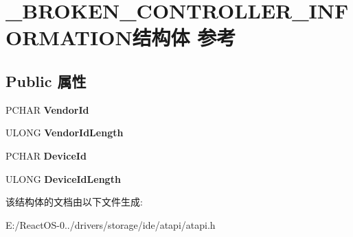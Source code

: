 \hypertarget{struct___b_r_o_k_e_n___c_o_n_t_r_o_l_l_e_r___i_n_f_o_r_m_a_t_i_o_n}{}\section{\+\_\+\+B\+R\+O\+K\+E\+N\+\_\+\+C\+O\+N\+T\+R\+O\+L\+L\+E\+R\+\_\+\+I\+N\+F\+O\+R\+M\+A\+T\+I\+O\+N结构体 参考}
\label{struct___b_r_o_k_e_n___c_o_n_t_r_o_l_l_e_r___i_n_f_o_r_m_a_t_i_o_n}
\subsection*{Public 属性}
\begin{DoxyCompactItemize}
\item 
\mbox{\label{struct___b_r_o_k_e_n___c_o_n_t_r_o_l_l_e_r___i_n_f_o_r_m_a_t_i_o_n_ab06b39170afdeb03c2047228edf3d4e4}} 
P\+C\+H\+AR {\bfseries Vendor\+Id}
\item 
\mbox{\label{struct___b_r_o_k_e_n___c_o_n_t_r_o_l_l_e_r___i_n_f_o_r_m_a_t_i_o_n_a9b57f5ba81532dfa1c7c9da15926768e}} 
U\+L\+O\+NG {\bfseries Vendor\+Id\+Length}
\item 
\mbox{\label{struct___b_r_o_k_e_n___c_o_n_t_r_o_l_l_e_r___i_n_f_o_r_m_a_t_i_o_n_a00f6e4a1f7621f930b102eab4e8917d2}} 
P\+C\+H\+AR {\bfseries Device\+Id}
\item 
\mbox{\label{struct___b_r_o_k_e_n___c_o_n_t_r_o_l_l_e_r___i_n_f_o_r_m_a_t_i_o_n_a3b98f242b07e3084acb26e830ce37359}} 
U\+L\+O\+NG {\bfseries Device\+Id\+Length}
\end{DoxyCompactItemize}


该结构体的文档由以下文件生成\+:\begin{DoxyCompactItemize}
\item 
E\+:/\+React\+O\+S-\/0../drivers/storage/ide/atapi/atapi.\+h\end{DoxyCompactItemize}
